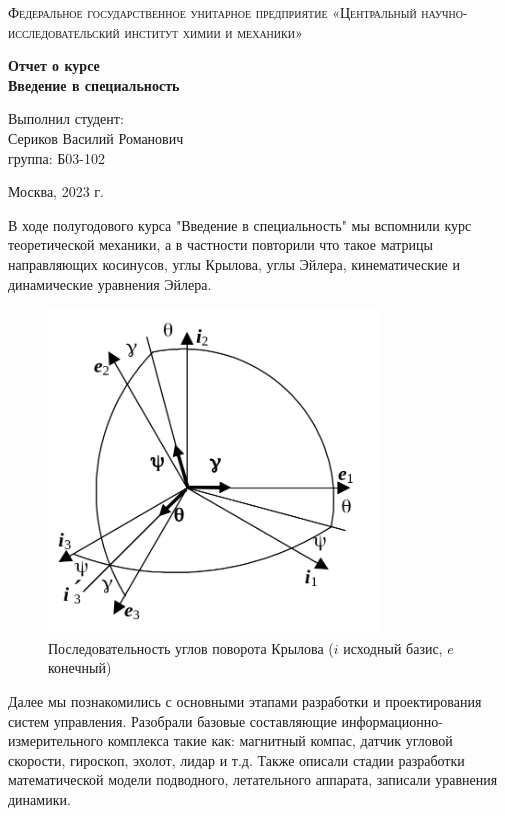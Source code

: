 \documentclass[a4paper, 12pt]{article}%
\begin{document}
	\begin{titlepage}
		\begin{center}
			
			\textsc{Федеральное государственное унитарное предприятие «Центральный научно-исследовательский институт химии и механики» 			\\[5mm]
			}
			
			\vfill
			
			\textbf{Отчет о курсе \\ Введение в специальность
				\\[50mm]
			}
			
		\end{center}
		
		\hfill
		\begin{minipage}{.5\textwidth}
			Выполнил студент:\\[2mm]
			Сериков Василий Романович\\[2mm]
			группа: Б03-102\\[5mm]
			
		\end{minipage}
		\vfill
		\begin{center}
			Москва, 2023 г.
		\end{center}
		
	\end{titlepage}
	
	\newpage
	\setcounter{page}{2}
	
	
	В ходе полугодового курса "Введение в специальность" мы вспомнили курс теоретической механики, а в частности повторили что такое матрицы направляющих косинусов, углы Крылова, углы Эйлера, кинематические и динамические уравнения Эйлера. 
	\begin{figure}[H]
		\centering
		\includegraphics[width=0.3\linewidth]{krilov}
		\caption{Последовательность углов поворота Крылова ($i$ исходный базис, $e$ конечный)}
	\end{figure}
	
	Далее мы познакомились с основными этапами разработки и проектирования систем управления. Разобрали базовые составляющие информационно-измерительного комплекса такие как: магнитный компас, датчик угловой скорости, гироскоп, эхолот, лидар и т.д.	Также описали стадии разработки математической модели подводного, летательного аппарата, записали уравнения динамики.
	
\end{document}
